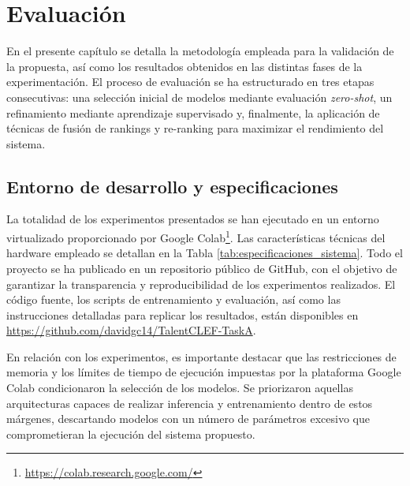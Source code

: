 
\chapter{Evaluación}
\label{ch:Evaluacion}

\noindent En el presente capítulo se detalla la metodología empleada para la validación de la propuesta, así como los resultados obtenidos en las distintas fases de la experimentación. El proceso de evaluación se ha estructurado en tres etapas consecutivas: una selección inicial de modelos mediante evaluación \textit{zero-shot}, un refinamiento mediante aprendizaje supervisado y, finalmente, la aplicación de técnicas de fusión de rankings y re-ranking para maximizar el rendimiento del sistema.

\section{Entorno de desarrollo y especificaciones}
\label{sec:Entorno}

\noindent La totalidad de los experimentos presentados se han ejecutado en un entorno virtualizado proporcionado por Google Colab\footnote{\url{https://colab.research.google.com/}}. Las características técnicas del hardware empleado se detallan en la Tabla \ref{tab:especificaciones_sistema}. Todo el proyecto se ha publicado en un repositorio público de GitHub, con el objetivo de garantizar la transparencia y reproducibilidad de los experimentos realizados. El código fuente, los scripts de entrenamiento y evaluación, así como las instrucciones detalladas para replicar los resultados, están disponibles en \url{https://github.com/davidgc14/TalentCLEF-TaskA}.

En relación con los experimentos, es importante destacar que las restricciones de memoria y los límites de tiempo de ejecución impuestas por la plataforma Google Colab condicionaron la selección de los modelos. Se priorizaron aquellas arquitecturas capaces de realizar inferencia y entrenamiento dentro de estos márgenes, descartando modelos con un número de parámetros excesivo que comprometieran la ejecución del sistema propuesto.

